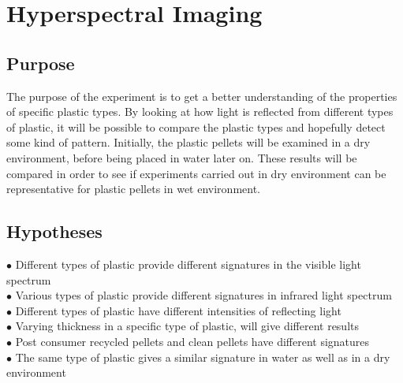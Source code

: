 \section{Hyperspectral Imaging} 


\subsection{Purpose}
The purpose of the experiment is to get a better understanding of the properties of specific plastic types. By looking at how light is reflected from different types of plastic, it will be possible to compare the plastic types and hopefully detect some kind of pattern. Initially, the plastic pellets will be examined in a dry environment, before being placed in water later on. These results will be compared in order to see if experiments carried out in dry environment can be representative for plastic pellets in wet environment. 

\subsection{Hypotheses}
$\bullet$ Different types of plastic provide different signatures in the visible light spectrum\\ 
$\bullet$ Various types of plastic provide different signatures in infrared light spectrum\\
$\bullet$ Different types of plastic have different intensities of reflecting light\\
$\bullet$ Varying thickness in a specific type of plastic, will give different results\\
$\bullet$ Post consumer recycled pellets and clean pellets have different signatures\\
$\bullet$ The same type of plastic gives a similar signature in water as well as in a dry environment

